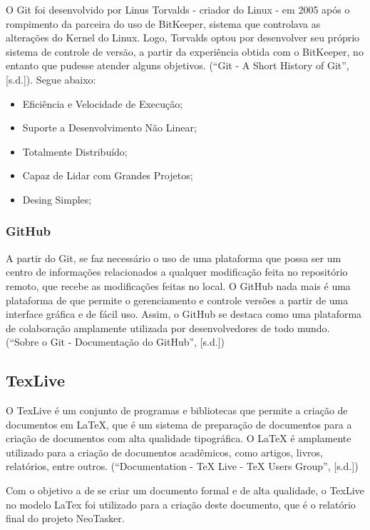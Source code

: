 \documentclass[a4paper,12pt]{article}
\begin{document}
O Git foi desenvolvido por Linus Torvalds - criador do Linux - em 2005 após o rompimento da parceira do uso de BitKeeper, sistema que controlava
as alterações do Kernel do Linux. Logo, Torvalds optou por desenvolver seu próprio sistema de controle de versão, a partir da experiência obtida com o BitKeeper, 
no entanto que pudesse atender alguns objetivos. (“Git - A Short History of Git”, [s.d.]). Segue abaixo:
\begin{itemize}
	\item Eficiência e Velocidade de Execução;
	\item Suporte a Desenvolvimento Não Linear;
	\item Totalmente Distribuído;
	\item Capaz de Lidar com Grandes Projetos;
	\item Desing Simples;
\end{itemize}


\subsubsection{GitHub}
A partir do Git, se faz necessário o uso de uma plataforma que possa ser um centro de informações relacionados a qualquer modificação feita no repositório remoto, 
que recebe as modificações feitas no local. O GitHub nada mais é uma plataforma de que permite o gerenciamento e controle versões a partir de uma interface gráfica 
e de fácil uso. Assim, o GitHub se destaca como uma plataforma de colaboração amplamente utilizada por desenvolvedores de todo mundo.
(“Sobre o Git - Documentação do GitHub”, [s.d.])

\subsection{TexLive}
O TexLive é um conjunto de programas e bibliotecas que permite a criação de documentos em LaTeX, que é um sistema de preparação de documentos para a criação de documentos
com alta qualidade tipográfica. O LaTeX é amplamente utilizado para a criação de documentos acadêmicos, como artigos, livros, relatórios, entre outros. (“Documentation - TeX Live - TeX Users Group”, [s.d.])

Com o objetivo a de se criar um documento formal e de alta qualidade, o TexLive no modelo LaTex foi utilizado para a criação deste documento, que é o relatório final do projeto NeoTasker.

\pagebreak
\end{document}
